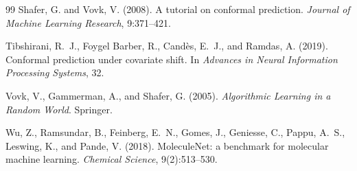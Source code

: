 \documentclass[11pt]{article}
\begin{document}
\begin{thebibliography}{99}
Shafer, G. and Vovk, V. (2008).
A tutorial on conformal prediction.
\emph{Journal of Machine Learning Research}, 9:371--421.

Tibshirani, R.~J., Foygel Barber, R., Cand\`es, E.~J., and Ramdas, A. (2019).
Conformal prediction under covariate shift.
In \emph{Advances in Neural Information Processing Systems}, 32.

Vovk, V., Gammerman, A., and Shafer, G. (2005).
\emph{Algorithmic Learning in a Random World}. Springer.

Wu, Z., Ramsundar, B., Feinberg, E.~N., Gomes, J., Geniesse, C., Pappu, A.~S.,
Leswing, K., and Pande, V. (2018).
MoleculeNet: a benchmark for molecular machine learning.
\emph{Chemical Science}, 9(2):513--530.

\end{thebibliography}
\end{document}
